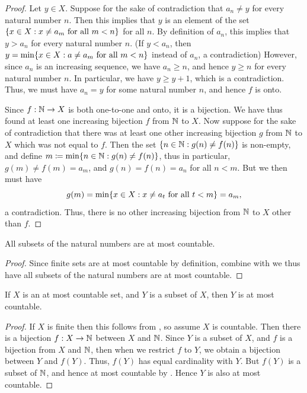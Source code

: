 \begin{proof}
  Let \(y \in X\).
  Suppose for the sake of contradiction that \(a_n \neq y\) for every natural number \(n\).
  Then this implies that \(y\) is an element of the set \(\left\lbrace x \in X : x \neq a_m \text{ for all } m < n\right\rbrace\) for all \(n\).
  By definition of \(a_n\), this implies that \(y > a_n\) for every natural number \(n\).
  (If \(y < a_n\), then \(y = \min\set{x \in X : a \neq a_m \text{ for all } m < n}\) instead of \(a_n\), a contradiction)
  However, since \(a_n\) is an increasing sequence, we have \(a_n \geq n\), and hence \(y \geq n\) for every natural number \(n\).
  In particular, we have \(y \geq y + 1\), which is a contradiction.
  Thus, we must have \(a_n = y\) for some natural number \(n\), and hence \(f\) is onto.

  Since \(f : \mathbb{N} \to X\) is both one-to-one and onto, it is a bijection.
  We have thus found at least one increasing bijection \(f\) from \(\mathbb{N}\) to \(X\).
  Now suppose for the sake of contradiction that there was at least one other increasing bijection \(g\) from \(\mathbb{N}\) to \(X\) which was not equal to \(f\).
  Then the set \(\left\lbrace n \in \mathbb{N} : g(n) \neq f(n)\right\rbrace\) is non-empty, and define \(m \coloneqq \min\set{n \in \N : g(n) \neq f(n)}\), thus in particular, \(g(m) \neq f(m) = a_m\), and \(g(n) = f(n) = a_n\) for all \(n < m\).
  But we then must have
  \[
    g(m) = \min\set{x \in X : x \neq a_t \text{ for all } t < m} = a_m,
  \]
  a contradiction.
  Thus, there is no other increasing bijection from \(\mathbb{N}\) to \(X\) other than \(f\).
\end{proof}

\begin{cor}\label{i:8.1.6}
  All subsets of the natural numbers are at most countable.
\end{cor}

\begin{proof}
  Since finite sets are at most countable by definition, combine with  we thus have all subsets of the natural numbers are at most countable.
\end{proof}

\begin{cor}\label{i:8.1.7}
  If \(X\) is an at most countable set, and \(Y\) is a subset of \(X\), then \(Y\) is at most countable.
\end{cor}

\begin{proof}
  If \(X\) is finite then this follows from , so assume \(X\) is countable.
  Then there is a bijection \(f : X \to \mathbb{N}\) between \(X\) and \(\mathbb{N}\).
  Since \(Y\) is a subset of \(X\), and \(f\) is a bijection from \(X\) and \(\mathbb{N}\), then when we restrict \(f\) to \(Y\), we obtain a bijection between \(Y\) and \(f(Y)\).
  Thus, \(f(Y)\) has equal cardinality with \(Y\).
  But \(f(Y)\) is a subset of \(\mathbb{N}\), and hence at most countable by .
  Hence \(Y\) is also at most countable.
\end{proof}

